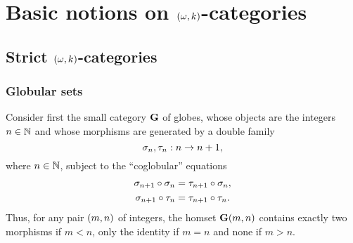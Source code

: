 \section{Basic notions on $(\omega,k)$-categories}\label{sec:basics}
\subsection{Strict $(\omega,k)$-categories}\label{subsec:okcat}
\subsubsection{Globular sets}\label{ssubsec:globset}
Consider first the small category $\mathbf{G}$ of globes, whose objects are
the integers $n\in\mathbb N$ and whose morphisms 
are generated by a double family
  \[
  \sigma_{n},\tau_{n}: n\to n+1,
\]
where $n\in\mathbb N$,
subject to the ``coglobular'' equations
\begin{align*}
  \sigma_{n+1}\circ\sigma_{n} & = \tau_{n+1}\circ\sigma_{n},\\
  \sigma_{n+1}\circ\tau_{n} & = \tau_{n+1}\circ\tau_{n}.
\end{align*}
Thus, for any pair $(m,n)$ of integers, the homset $\mathbf{G}(m,n)$ contains exactly two morphisms if $m<n$, only the identity if $m=n$ and none if $m>n$.

